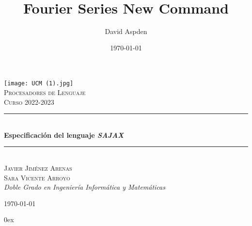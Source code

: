 \documentclass[10pt a4paper]{article}
\title{Fourier Series New Command}
\author{David Aspden}
\date{\today}
\numberwithin{equation}{section}
\begin{document}
\begin{titlepage} %
	\newcommand{\HRule}{\rule{\linewidth}{0.5mm}} %
	
	\center %
	
	\texttt{[image: UCM (1).jpg]}\\[1cm]
	
	\textsc{\Large Procesadores de Lenguaje}\\[0.5cm] %
	
	\textsc{\large Curso 2022-2023}\\[0.5cm] %
	
	
	\HRule\\[0.6cm]
	
	{\huge\bfseries Especificación del lenguaje \textit{SAJAX}}
	\HRule\\[1.5cm]
	
	

	
\textsc{Javier Jiménez Arenas}\\
\textsc{Sara Vicente Arroyo}\\
{\large\textit{Doble Grado en Ingeniería Informática y Matemáticas}}
	
	
	\vfill\vfill\vfill %
	
	{\large\today} %
	
	
	\vfill\vfill
	 
	
	\vfill %
	
\end{titlepage}
\newtheorem{definition}{Definición}[section]
\newtheorem{theorem}{Teorema}[section]
\newtheorem{corollary}{Corolario}[theorem]
\newtheorem{lemma}[theorem]{Lemma}
\newtheorem{ejemplo}{Ejemplo}[section]
\pagestyle{fancy}
\parindent 0ex
\end{document}
